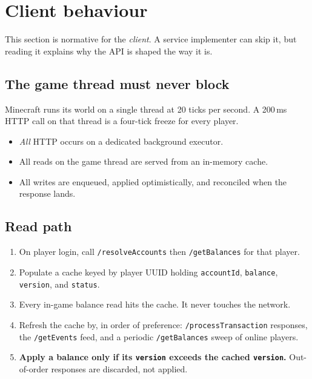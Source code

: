 \documentclass[11pt,a4paper]{article}
\newcommand{\code}[1]{\texttt{\small #1}}
\newcommand{\keybox}[2]{%
  \par\vspace{0.5em}\noindent
  \colorbox{#1}{%
    \begin{minipage}{\dimexpr\linewidth-2\fboxsep\relax}
    \vspace{0.35em}\small #2\vspace{0.35em}
    \end{minipage}}%
  \par\vspace{0.5em}}
\newcommand{\warn}[1]{\keybox{omceWarnWash}{#1}}
\begin{document}
\section{Client behaviour}

This section is normative for the \emph{client}. A service implementer can skip it, but reading it
explains why the API is shaped the way it is.

\subsection{The game thread must never block}

\warn{Minecraft runs its world on a single thread at 20 ticks per second. A 200\,ms HTTP call on
that thread is a four-tick freeze for every player.}

\begin{itemize}
\item \emph{All} HTTP occurs on a dedicated background executor.
\item All reads on the game thread are served from an in-memory cache.
\item All writes are enqueued, applied optimistically, and reconciled when the response lands.
\end{itemize}

\subsection{Read path}

\begin{enumerate}
\item On player login, call \code{/resolveAccounts} then \code{/getBalances} for that player.
\item Populate a cache keyed by player UUID holding \code{accountId}, \code{balance},
      \code{version}, and \code{status}.
\item Every in-game balance read hits the cache. It never touches the network.
\item Refresh the cache by, in order of preference: \code{/processTransaction} responses, the
      \code{/getEvents} feed, and a periodic \code{/getBalances} sweep of online players.
\item \textbf{Apply a balance only if its \code{version} exceeds the cached \code{version}.}
      Out-of-order responses are discarded, not applied.
\end{enumerate}
\end{document}
